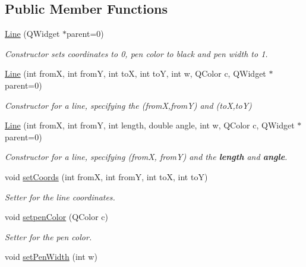 \subsection*{Public Member Functions}
\begin{DoxyCompactItemize}
\item 
\hypertarget{class_line_a4d475f9d634f50933ca84e25d7cf32f9}{}\hyperlink{class_line_a4d475f9d634f50933ca84e25d7cf32f9}{Line} (Q\+Widget $\ast$parent=0)\label{class_line_a4d475f9d634f50933ca84e25d7cf32f9}

\begin{DoxyCompactList}\small\item\em Constructor sets coordinates to 0, pen color to black and pen width to 1. \end{DoxyCompactList}\item 
\hyperlink{class_line_a37f70dab8d5cc7560e6362093a3aa1b9}{Line} (int from\+X, int from\+Y, int to\+X, int to\+Y, int w, Q\+Color c, Q\+Widget $\ast$parent=0)
\begin{DoxyCompactList}\small\item\em Constructor for a line, specifying the (from\+X,from\+Y) and (to\+X,to\+Y) \end{DoxyCompactList}\item 
\hyperlink{class_line_a742b2aea487313953635d1e504c6b866}{Line} (int from\+X, int from\+Y, int length, double angle, int w, Q\+Color c, Q\+Widget $\ast$parent=0)
\begin{DoxyCompactList}\small\item\em Constructor for a line, specifying (from\+X, from\+Y) and the {\bfseries length} and {\bfseries angle}. \end{DoxyCompactList}\item 
void \hyperlink{class_line_ac1475ffee823a7c05b2ac91bfe61596d}{set\+Coords} (int from\+X, int from\+Y, int to\+X, int to\+Y)
\begin{DoxyCompactList}\small\item\em Setter for the line coordinates. \end{DoxyCompactList}\item 
void \hyperlink{class_line_ac5b6d8e786cf3820fa36b8bda7130823}{setpen\+Color} (Q\+Color c)
\begin{DoxyCompactList}\small\item\em Setter for the pen color. \end{DoxyCompactList}\item 
void \hyperlink{class_line_a346d88820371b5a4710eed8a638fc451}{set\+Pen\+Width} (int w)

\end{DoxyCompactItemize}
